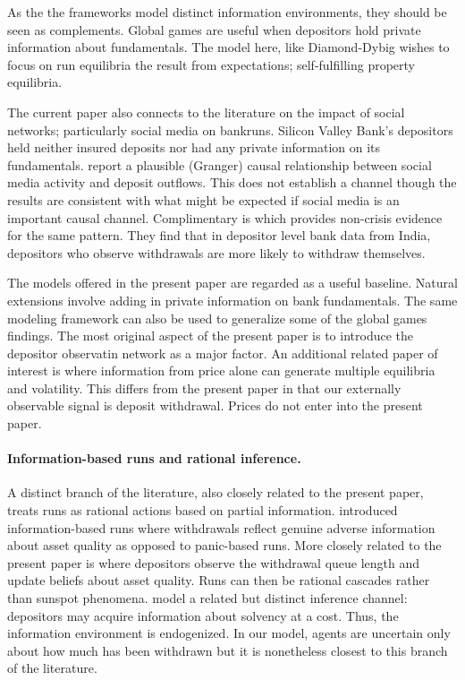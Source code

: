 \documentclass[12pt]{article}\usepackage[]{graphicx}\usepackage[]{xcolor}
\begin{document}
As the the frameworks model distinct information environments, they should be seen as complements. Global games
are useful when depositors hold private information about fundamentals. The model here, like Diamond-Dybig
wishes to focus on run equilibria the result from expectations; self-fulfilling property equilibria. 

The current paper also connects to the literature on the impact of social networks; particularly social media on bankruns. 
Silicon Valley Bank's depositors held neither insured deposits nor had any private information on its fundamentals. 
\citet{cookson2023social} report a plausible (Granger) causal relationship between social media activity and deposit outflows.
This does not establish a channel though the results are consistent with what might be expected if social media is an important causal channel. 
Complimentary is \citet{iyer2012understanding} which provides non-crisis evidence for the same pattern. They find that in depositor level bank
data from India, depositors who observe withdrawals are more likely to withdraw themselves.

The models offered in the present paper are regarded as a useful baseline. Natural extensions involve adding in private information on bank fundamentals. The same modeling 
framework can also be used to generalize some of the global games findings. The most original aspect of the present paper is to introduce the depositor observatin network 
as a major factor. An additional related paper of interest is \citet{angeletoswerning2006crises} where information from price alone can generate multiple equilibria and volatility.
This differs from the present paper in that our externally observable signal is deposit withdrawal. Prices do not enter into the present paper. 

\paragraph{Information-based runs and rational inference.}
A distinct branch of the literature, also closely related to the present paper, treats runs as rational actions based on partial information. 
\citet{jacklin1988distinguishing} introduced information-based runs where withdrawals reflect genuine adverse information about asset quality as opposed to
panic-based runs. More closely related to the present paper is
\citet{chari1988banking} where depositors observe the withdrawal queue length and update beliefs about asset quality. Runs can then be rational cascades rather than sunspot phenomena.
\citet{hemanela2016information} model a related but distinct inference channel: 
depositors may acquire information about solvency at a cost. Thus, the information environment is endogenized. In our model, agents are uncertain only
about how much has been withdrawn but it is nonetheless closest to this branch of the literature. 
\end{document}
